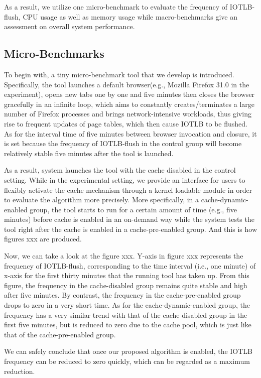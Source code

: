 \documentclass[letterpaper,twocolumn,10pt]{article}
\begin{document}
As a result, we utilize one micro-benchmark to evaluate the frequency of IOTLB-flush, CPU usage as well as memory usage while macro-benchmarks give an assessment on overall system performance.  

\subsection{Micro-Benchmarks}

To begin with, a tiny micro-benchmark tool that we develop is introduced. Specifically, the tool launches a default browser(e.g., Mozilla Firefox 31.0 in the experiment), opens new tabs one by one and five minutes then closes the browser gracefully in an infinite loop, which aims to constantly creates/terminates a large number of Firefox processes and brings network-intensive workloads, thus giving rise to frequent updates of page tables, which then cause IOTLB to be flushed. As for the interval time of five minutes between browser invocation and closure, it is set because the frequency of IOTLB-flush in the control group will become relatively stable five minutes after the tool is launched.

As a result, system launches the tool with the cache disabled in the control setting. While in the experimental setting, we provide an interface for users to flexibly activate the cache mechanism through a kernel loadable module in order to evaluate the algorithm more precisely. More specifically, in a cache-dynamic-enabled group, the tool starts to run for a certain amount of time (e.g., five minutes) before cache is enabled in an on-demand way while the system tests the tool right after the cache is enabled in a cache-pre-enabled group. And this is how figures xxx are produced. 

Now, we can take a look at the figure xxx. Y-axis in figure xxx represents the frequency of IOTLB-flush, corresponding to the time interval (i.e., one minute) of x-axis for the first thirty minutes that the running tool has taken up. From this figure, the frequency in the cache-disabled group remains quite stable and high after five minutes. By contrast, the frequency in the cache-pre-enabled group drops to zero in a very short time. As for the cache-dynamic-enabled group, the frequency has a very similar trend with that of the cache-disabled group in the first five minutes, but is reduced to zero due to the cache pool, which is just like that of the cache-pre-enabled group.

We can safely conclude that once our proposed algorithm is enabled, the IOTLB frequency can be reduced to zero quickly, which can be regarded as a maximum reduction.
\end{document}
